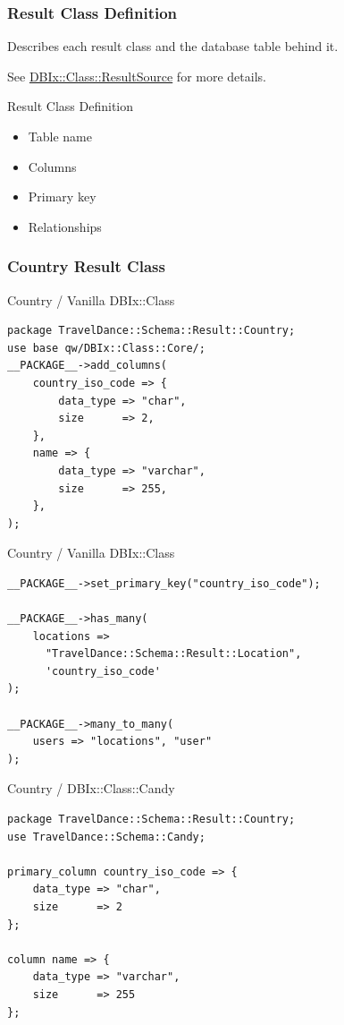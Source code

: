 \subsubsection{Result Class Definition}
Describes each result class and the database table behind it. 

See \href{https://metacpan.org/pod/DBIx::Class::ResultSource}{DBIx::Class::ResultSource} for more details.

\begin{frame}{Result Class Definition}

\begin{itemize}
\item Table name
\item Columns
\item Primary key
\item Relationships
\end{itemize}
\end{frame}

\subsubsection{Country Result Class}

\begin{frame}[fragile]{Country / Vanilla DBIx::Class}
\begin{lstlisting}
package TravelDance::Schema::Result::Country;
use base qw/DBIx::Class::Core/;
__PACKAGE__->add_columns(
    country_iso_code => {
        data_type => "char",
        size      => 2,
    },
    name => {
        data_type => "varchar",
        size      => 255,
    },
);
\end{lstlisting}
\end{frame}

\begin{frame}[fragile]{Country / Vanilla DBIx::Class}
\begin{lstlisting}
__PACKAGE__->set_primary_key("country_iso_code");

__PACKAGE__->has_many(
    locations =>
      "TravelDance::Schema::Result::Location",
      'country_iso_code'
);

__PACKAGE__->many_to_many(
    users => "locations", "user"
);
\end{lstlisting}
\end{frame}

\begin{frame}[fragile]{Country / DBIx::Class::Candy}
\begin{lstlisting}
package TravelDance::Schema::Result::Country;
use TravelDance::Schema::Candy;

primary_column country_iso_code => {
    data_type => "char",
    size      => 2
};

column name => {
    data_type => "varchar",
    size      => 255
};
\end{lstlisting}
\end{frame}

